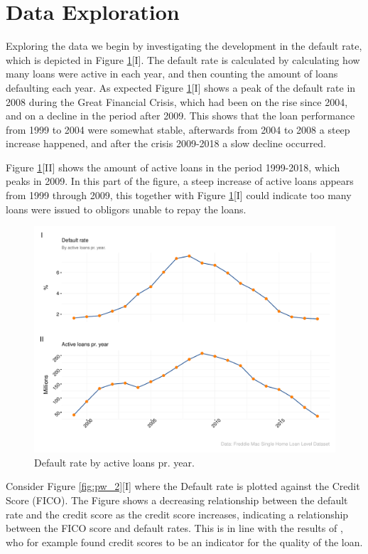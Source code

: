 \section{Data Exploration}
Exploring the data we begin by investigating the development in the default rate, which is depicted in Figure \ref{fig:pw_1}[I]. The default rate is calculated by calculating how many loans were active in each year, and then counting the amount of loans defaulting each year. As expected Figure \ref{fig:pw_1}[I] shows a peak of the default rate in 2008 during the Great Financial Crisis, which had been on the rise since 2004, and on a decline in the period after 2009. This shows that the loan performance from 1999 to 2004 were somewhat stable, afterwards from 2004 to 2008 a steep increase happened, and after the crisis 2009-2018 a slow decline occurred.

Figure \ref{fig:pw_1}[II] shows the amount of active loans in the period 1999-2018, which peaks in 2009. In this part of the figure, a steep increase of active loans appears from 1999 through 2009, this together with Figure \ref{fig:pw_1}[I] could indicate too many loans were issued to obligors unable to repay the loans. 

\begin{figure}[H]
    \centering
    \includegraphics[width = \textwidth]{Figures/pw_1.pdf}
    \caption{Default rate by active loans pr. year.}
    \label{fig:pw_1}
\end{figure}

Consider Figure \ref{fig:pw_2}[I] where the Default rate is plotted against the Credit Score (FICO). The Figure shows a decreasing relationship between the default rate and the credit score as the credit score increases, indicating a relationship between the FICO score and default rates. This is in line with the results of \cite{Dannis_Pennington_2005},  who for example found credit scores to be an indicator for the quality of the loan. 

